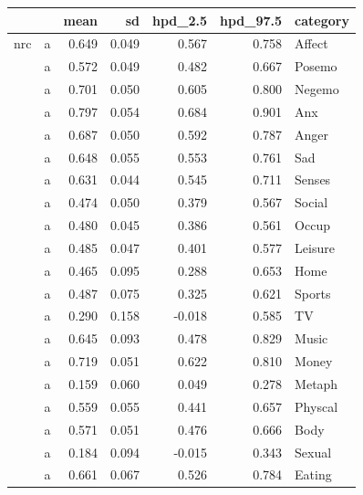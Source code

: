 \documentclass[11pt,a4paper]{article}
\begin{document}
\tiny
\begin{longtable}{llrrrrl}

\toprule
   &    &   mean &     sd &  hpd\_2.5 &  hpd\_97.5 &        category \\
\midrule
nrc & a &  0.649 &  0.049 &    0.567 &     0.758 &          Affect \\
   & a &  0.572 &  0.049 &    0.482 &     0.667 &          Posemo \\
   & a &  0.701 &  0.050 &    0.605 &     0.800 &          Negemo \\
   & a &  0.797 &  0.054 &    0.684 &     0.901 &             Anx \\
   & a &  0.687 &  0.050 &    0.592 &     0.787 &           Anger \\
   & a &  0.648 &  0.055 &    0.553 &     0.761 &             Sad \\
   & a &  0.631 &  0.044 &    0.545 &     0.711 &          Senses \\
   & a &  0.474 &  0.050 &    0.379 &     0.567 &          Social \\
   & a &  0.480 &  0.045 &    0.386 &     0.561 &           Occup \\
   & a &  0.485 &  0.047 &    0.401 &     0.577 &         Leisure \\
   & a &  0.465 &  0.095 &    0.288 &     0.653 &            Home \\
   & a &  0.487 &  0.075 &    0.325 &     0.621 &          Sports \\
   & a &  0.290 &  0.158 &   -0.018 &     0.585 &              TV \\
   & a &  0.645 &  0.093 &    0.478 &     0.829 &           Music \\
   & a &  0.719 &  0.051 &    0.622 &     0.810 &           Money \\
   & a &  0.159 &  0.060 &    0.049 &     0.278 &          Metaph \\
   & a &  0.559 &  0.055 &    0.441 &     0.657 &         Physcal \\
   & a &  0.571 &  0.051 &    0.476 &     0.666 &            Body \\
   & a &  0.184 &  0.094 &   -0.015 &     0.343 &          Sexual \\
   & a &  0.661 &  0.067 &    0.526 &     0.784 &          Eating \\

\end{longtable}
\end{document}
